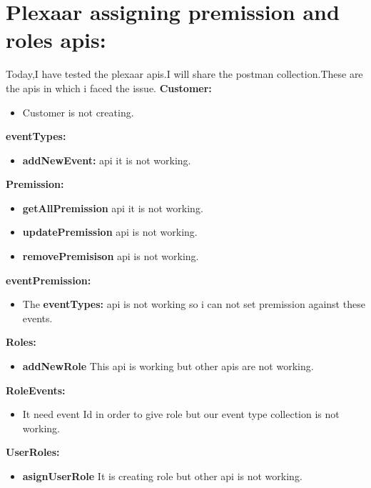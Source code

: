 \documentclass[12pt,a4paper]{article}
\begin{document}
	
 
 \clearpage
\section{Plexaar  assigning premission and roles apis:}
Today,I have tested the plexaar apis.I will share the postman collection.These are the apis in which i faced the issue.
\newline\textbf{Customer:}
\begin{itemize}
    \item Customer is not creating.
\end{itemize}
\newline\textbf{eventTypes:}
\begin{itemize}
    \item \textbf{addNewEvent:} api it is not working.
\end{itemize}
 \textbf{Premission:}
\begin{itemize}
    \item \textbf{getAllPremission} api it is not working.
    \item \textbf{updatePremission} api is not working.
    \item \textbf{removePremisison} api is not working.
\end{itemize}
\textbf{eventPremission:}
\begin{itemize}
\item The \textbf{eventTypes:} api is not working so i can not set premission against these events.
\end{itemize}
\textbf{Roles:}
\begin{itemize}
    \item \textbf{addNewRole} This api is working but other apis are not working.
\end{itemize}
\textbf{RoleEvents:}
\begin{itemize}
    \item It need event Id in order to give role but our event type collection is not working.
\end{itemize}
\textbf{UserRoles:}
\begin{itemize}
    \item \textbf{asignUserRole} It is creating role but other api is not working.
\end{itemize}
\end{document}
